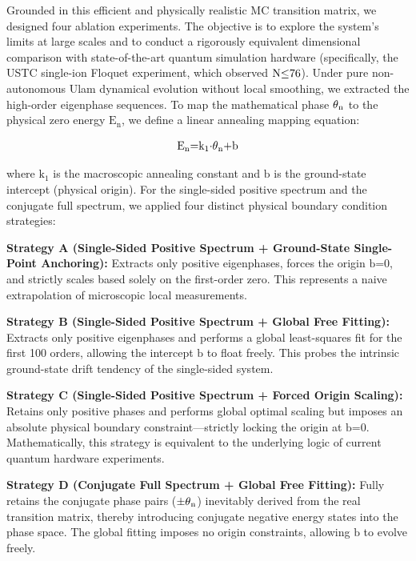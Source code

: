 \documentclass[fractalfract,article,submit,oneauthor,pdftex]{Definitions/mdpi}
\begin{document}
Grounded in this efficient and physically realistic MC transition
matrix, we designed four ablation experiments. The objective is to
explore the system's limits at large scales and to conduct a rigorously
equivalent dimensional comparison with state-of-the-art quantum
simulation hardware (specifically, the USTC single-ion Floquet
experiment, which observed \(\text{N}\text{\ensuremath{\le}76}\)). Under pure
non-autonomous Ulam dynamical evolution without local smoothing, we
extracted the high-order eigenphase sequences. To map the mathematical
phase \(\text{\ensuremath{\theta}}_{\text{n}}\) to the physical zero energy
\(\text{E}_{\text{n}}\), we define a linear annealing mapping equation:

\begin{equation}
\text{E}_{\text{n}}\text{=}\text{k}_{\text{1}}\text{\ensuremath{\cdot}}\text{\ensuremath{\theta}}_{\text{n}}\text{+}\text{b}
\end{equation}

where \(\text{k}_{\text{1}}\) is the macroscopic annealing constant and
\(\text{b}\) is the ground-state intercept (physical origin). For the
single-sided positive spectrum and the conjugate full spectrum, we
applied four distinct physical boundary condition strategies:

\textbf{Strategy A (Single-Sided Positive Spectrum + Ground-State
Single-Point Anchoring):} Extracts only positive eigenphases, forces the
origin \(\text{b}\text{=0}\), and strictly scales based solely on the
first-order zero. This represents a naive extrapolation of microscopic
local measurements.

\textbf{Strategy B (Single-Sided Positive Spectrum + Global Free
Fitting):} Extracts only positive eigenphases and performs a global
least-squares fit for the first 100 orders, allowing the intercept
\(\text{b}\) to float freely. This probes the intrinsic ground-state
drift tendency of the single-sided system.

\textbf{Strategy C (Single-Sided Positive Spectrum + Forced Origin
Scaling):} Retains only positive phases and performs global optimal
scaling but imposes an absolute physical boundary constraint---strictly
locking the origin at \(\text{b}\text{=0}\). Mathematically, this
strategy is equivalent to the underlying logic of current quantum
hardware experiments.

\textbf{Strategy D (Conjugate Full Spectrum + Global Free Fitting):}
Fully retains the conjugate phase pairs
(\(\text{\ensuremath{\pm}}\text{\ensuremath{\theta}}_{\text{n}}\)) inevitably derived from the real
transition matrix, thereby introducing conjugate negative energy states
into the phase space. The global fitting imposes no origin constraints,
allowing \(\text{b}\) to evolve freely.
\end{document}
